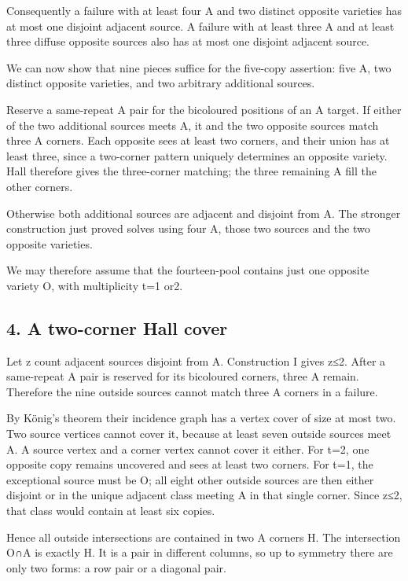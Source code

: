 \documentclass[
  10pt,
]{article}
\begin{document}
Consequently a failure with at least four A and two distinct opposite
varieties has at most one disjoint adjacent source. A failure with at
least three A and at least three diffuse opposite sources also has at
most one disjoint adjacent source.

We can now show that nine pieces suffice for the five-copy assertion:
five A, two distinct opposite varieties, and two arbitrary additional
sources.

Reserve a same-repeat A pair for the bicoloured positions of an A
target. If either of the two additional sources meets A, it and the two
opposite sources match three A corners. Each opposite sees at least two
corners, and their union has at least three, since a two-corner pattern
uniquely determines an opposite variety. Hall therefore gives the
three-corner matching; the three remaining A fill the other corners.

Otherwise both additional sources are adjacent and disjoint from A. The
stronger construction just proved solves using four A, those two sources
and the two opposite varieties.

We may therefore assume that the fourteen-pool contains just one
opposite variety O, with multiplicity t=1 or2.

\hypertarget{a-two-corner-hall-cover}{%
\subsection*{4. A two-corner Hall cover}\label{a-two-corner-hall-cover}}

Let z count adjacent sources disjoint from A. Construction I gives z≤2.
After a same-repeat A pair is reserved for its bicoloured corners, three
A remain. Therefore the nine outside sources cannot match three A
corners in a failure.

By König's theorem their incidence graph has a vertex cover of size at
most two. Two source vertices cannot cover it, because at least seven
outside sources meet A. A source vertex and a corner vertex cannot cover
it either. For t=2, one opposite copy remains uncovered and sees at
least two corners. For t=1, the exceptional source must be O; all eight
other outside sources are then either disjoint or in the unique adjacent
class meeting A in that single corner. Since z≤2, that class would
contain at least six copies.

Hence all outside intersections are contained in two A corners H. The
intersection O∩A is exactly H. It is a pair in different columns, so up
to symmetry there are only two forms: a row pair or a diagonal pair.
\end{document}
